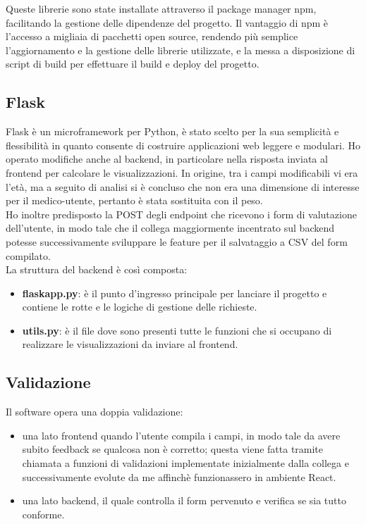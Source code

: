 \noindent Queste librerie sono state installate attraverso il package manager npm, facilitando la gestione delle dipendenze del progetto. Il vantaggio di npm è l'accesso a migliaia di pacchetti open source, rendendo più semplice l'aggiornamento e la gestione delle librerie utilizzate, e la messa a disposizione di script di build per effettuare il build e deploy del progetto. 

\subsection{Flask}
Flask è un microframework per Python, è stato scelto per la sua semplicità e flessibilità in quanto consente di costruire applicazioni web leggere e modulari.
Ho operato modifiche anche al backend, in particolare nella risposta inviata al frontend per calcolare le visualizzazioni. In origine, tra i campi modificabili vi era l'età, ma a seguito di analisi si è concluso che non era una dimensione di interesse per il medico-utente, pertanto è stata sostituita con il peso.\\ 
Ho inoltre predisposto la POST degli endpoint che ricevono i form di valutazione dell'utente, in modo tale che il collega maggiormente incentrato sul backend potesse successivamente sviluppare le feature per il salvataggio a CSV del form compilato.\\
La struttura del backend è così composta: 
\begin{itemize}
    \item \textbf{flaskapp.py}: è il punto d'ingresso principale per lanciare il progetto e contiene le rotte e le logiche di gestione delle richieste.
    \item \textbf{utils.py}: è il file dove sono presenti tutte le funzioni che si occupano di realizzare le visualizzazioni da inviare al frontend.
\end{itemize}

\subsection{Validazione}
Il software opera una doppia validazione:
\begin{itemize} 
    \item una lato frontend quando l'utente compila i campi, in modo tale da avere subito feedback se qualcosa non è corretto; questa viene fatta tramite chiamata a funzioni di validazioni implementate inizialmente dalla collega e successivamente evolute da me affinchè funzionassero in ambiente React. 
    \item una lato backend, il quale controlla il form pervenuto e verifica se sia tutto conforme.
\end{itemize}

